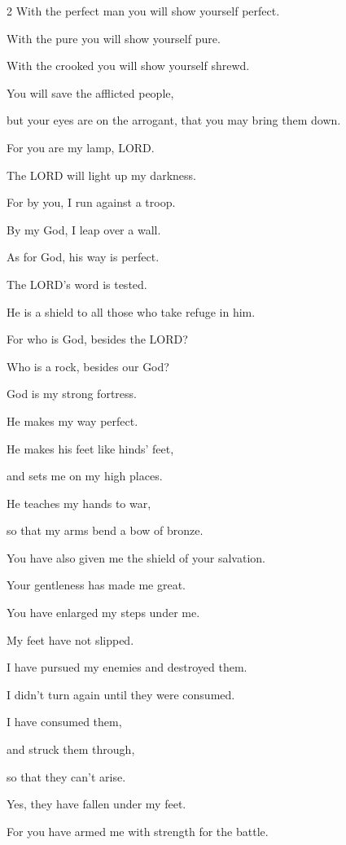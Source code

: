\begin{multicols}{2}
With the perfect man you will show yourself perfect.

\myverse{}With the pure you will show yourself pure.

With the crooked you will show yourself shrewd.

\myverse{}You will save the afflicted people,

but your eyes are on the arrogant, that you may bring them down.

\myverse{}For you are my lamp, LORD.

The LORD will light up my darkness.

\myverse{}For by you, I run against a troop.

By my God, I leap over a wall.

\myverse{}As for God, his way is perfect.

The LORD’s word is tested.

He is a shield to all those who take refuge in him.


\vspace{\baselineskip}
\myverse{}For who is God, besides the LORD?

Who is a rock, besides our God?

\myverse{}God is my strong fortress.

He makes my way perfect.

\myverse{}He makes his feet like hinds’ feet,

and sets me on my high places.

\myverse{}He teaches my hands to war,

so that my arms bend a bow of bronze.

\myverse{}You have also given me the shield of your salvation.

Your gentleness has made me great.

\myverse{}You have enlarged my steps under me.

My feet have not slipped.

\myverse{}I have pursued my enemies and destroyed them.

I didn’t turn again until they were consumed.

\myverse{}I have consumed them,

and struck them through,

so that they can’t arise.

Yes, they have fallen under my feet.

\myverse{}For you have armed me with strength for the battle.


\end{multicols}
